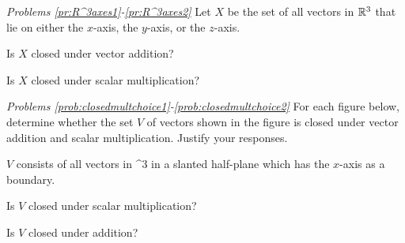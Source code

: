 \documentclass{ximera}
\begin{document}
\emph{Problems \ref{pr:R^3axes1}-\ref{pr:R^3axes2}}
 Let $X$ be the set of all vectors in $\mathbb{R}^3$ that lie on either the $x$-axis, the $y$-axis, or the $z$-axis.    
 
 	\begin{problem}\label{pr:R^3axes1}
  Is $X$ closed under vector addition?
  
  \begin{multipleChoice}
 \end{multipleChoice}
 
 	\end{problem}
 	\begin{problem}\label{pr:R^3axes2}
 Is $X$ closed under scalar multiplication?
 
 \begin{multipleChoice}
 \end{multipleChoice}
 	\end{problem}


\emph{Problems \ref{prob:closedmultchoice1}-\ref{prob:closedmultchoice2}}
For each figure below, determine whether the set $V$ of vectors shown in the figure is closed under vector addition and scalar multiplication.  Justify your responses.
  
\begin{problem}\label{prob:closedmultchoice1} 
$V$ consists of all vectors in ^3 in a slanted half-plane which has the $x$-axis as a boundary.


Is $V$ closed under scalar multiplication?
 
 \begin{multipleChoice}
 \end{multipleChoice}
 
 Is $V$ closed under addition?
 
 \begin{multipleChoice}
 \end{multipleChoice}
\end{problem}
\end{document}

